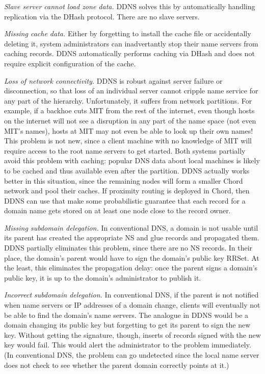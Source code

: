 {\em Slave server cannot load zone data.}
DDNS solves this by automatically handling replication 
via the DHash protocol.
There are no slave servers.

{\em Missing cache data.}
Either by forgetting to install the cache file or accidentally deleting it,
system administrators can inadvertantly stop their name servers
from caching records.
DDNS automatically performs caching via DHash and does
not require explicit configuration of the cache.

{\em Loss of network connectivity.}
DDNS is robust against server failure or disconnection, so that loss of
an individual server cannot cripple name service for any part of the
hierarchy. Unfortunately, it suffers from 
network partitions. For example, if a backhoe cuts MIT from 
the rest of the internet,
even though hosts on the internet will not see a disruption in any
part of the name space (not even MIT's names), hosts at MIT
may not even be able to look up their own names! 
This problem is not new, since a client machine with no 
knowledge of MIT will require access to the root name servers
to get started.
Both systems partially avoid this problem with caching:
popular DNS data about local machines is likely to be cached
and thus available even after the partition.
DDNS actually works better in this situation, since the remaining
nodes will form a smaller Chord network and pool their caches.
If proximity routing is deployed in Chord, then DDNS
can use that make some probabilistic guarantee that each 
record for a domain name gets stored on at least one node close to
the record owner.
%

{\em Missing subdomain delegation.}
In conventional DNS, a domain is not usable until its parent
has created the appropriate NS and glue records and
propagated them.
DDNS partially eliminates this problem, since there are 
no NS records.
In their place, the domain's parent would have to sign the domain's
public key RRSet.
At the least, this eliminates the propagation delay: once the
parent signs a domain's public key, it is up to the domain's administrator
to publish it.

{\em Incorrect subdomain delegation.}
In conventional DNS, if the parent is not notified 
when name servers or IP addresses of a domain change,
clients will eventually not be able to find the domain's name servers.
The analogue in DDNS would be a domain changing its public
key but forgetting to get its parent to sign the new key.
Without getting the signature, though, inserts of records signed
with the new key would fail.  This would alert the administrator
to the problem immediately.  (In conventional DNS, the problem
can go undetected since the local name server does not check
to see whether the parent domain correctly points at it.)

